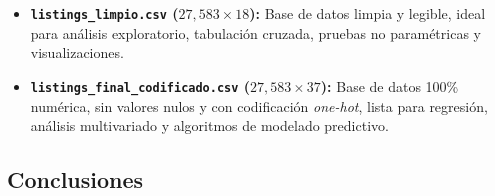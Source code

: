 \documentclass[12pt,letterpaper,oneside]{report}
\begin{document}
\begin{itemize}[leftmargin=1.5em]
  \item \textbf{\texttt{listings\_limpio.csv} ($27{,}583 \times 18$):} Base de datos limpia y legible, ideal para análisis exploratorio, tabulación cruzada, pruebas no paramétricas y visualizaciones.
  \item \textbf{\texttt{listings\_final\_codificado.csv} ($27{,}583 \times 37$):} Base de datos 100\% numérica, sin valores nulos y con codificación \textit{one-hot}, lista para regresión, análisis multivariado y algoritmos de modelado predictivo.
\end{itemize}

\subsection{Conclusiones}
\end{document}
